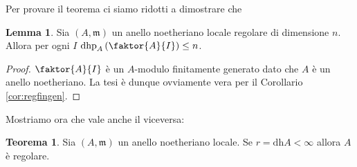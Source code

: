 \documentclass[a4paper,11pt,oneside]{book}
\newcommand{\m}{\mathfrak{m}}
\renewcommand{\dh}{\mathrm{dh}}
\DeclareMathOperator{\dhp}{dhp}
\theoremstyle{definition}
\newtheorem{teo}[section]{Teorema}
\newtheorem{lemma}{Lemma}
\begin{document}
     Per provare il teorema ci siamo ridotti a dimostrare che 
     
     \begin{lemma}
      Sia $(A,\m)$ un anello noetheriano locale regolare di dimensione $n$. 
      Allora  per ogni $I$ $\dhp_A\left( \faktor{A}{I}\right)\leq n$.
     \end{lemma}

     \begin{proof}
      $\faktor{A}{I}$ è un $A$-modulo finitamente generato dato che $A$ è un anello noetheriano. La tesi è
      dunque ovviamente vera per il Corollario \ref{cor:regfingen}.
     \end{proof}

     Mostriamo ora che vale anche il viceversa:
     
     \begin{teo}
      Sia $(A,\m)$ un anello noetheriano locale. Se $r=\dh A<\infty$ allora $A$ è regolare.
     \end{teo}
\end{document}
